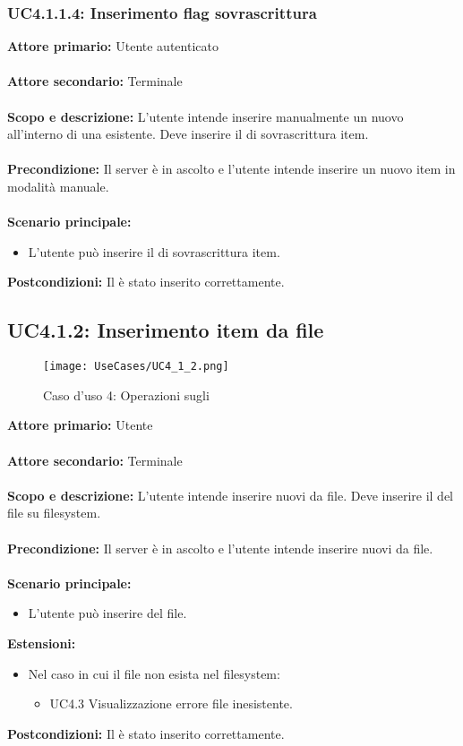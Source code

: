 \documentclass{scalatekids-article}
\begin{document}
\subsubsection{UC4.1.1.4: Inserimento flag sovrascrittura}

\textbf{Attore primario:} Utente autenticato\\ \\
\textbf{Attore secondario:} Terminale\\ \\
\textbf{Scopo e descrizione:} L'utente intende inserire manualmente un nuovo  all'interno di una  esistente. Deve inserire il  di sovrascrittura item.\\ \\
\textbf{Precondizione:} Il server è in ascolto e l'utente intende inserire un nuovo item in modalità manuale.\\ \\
\textbf{Scenario principale:}
\begin{itemize}
\item L'utente può inserire il  di sovrascrittura item.
\end{itemize}
\textbf{Postcondizioni:} Il  è stato inserito correttamente.

\subsection{UC4.1.2: Inserimento item da file}

\begin{figure}[H]
  \begin{center}
    \texttt{[image: UseCases/UC4\_1\_2.png]}
    \caption*{Caso d'uso 4: Operazioni sugli }
  \end{center}
\end{figure}
\textbf{Attore primario:} Utente\\ \\
\textbf{Attore secondario:} Terminale\\ \\
\textbf{Scopo e descrizione:} L'utente intende inserire nuovi  da file. Deve inserire il  del file su filesystem.\\ \\
\textbf{Precondizione:} Il server è in ascolto e l'utente intende inserire nuovi  da file.\\ \\
\textbf{Scenario principale:}
\begin{itemize}
\item L'utente può inserire  del file.
\end{itemize}
\textbf{Estensioni:}
\begin{itemize}
\item Nel caso in cui il file non esista nel filesystem:
  \begin{itemize}
  \item UC4.3 Visualizzazione errore file inesistente.
  \end{itemize}
\end{itemize}
\textbf{Postcondizioni:} Il  è stato inserito correttamente.
\end{document}
